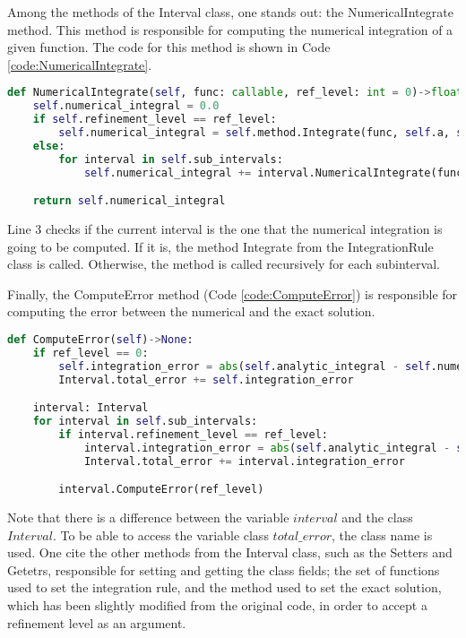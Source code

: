 Among the methods of the Interval class, one stands out: the NumericalIntegrate method. This method is responsible for computing the numerical integration of a given function. The code for this method is shown in Code \ref{code:NumericalIntegrate}. 
\begin{lstlisting}[language=python, caption={NumericalIntegrate Method.}, label={code:NumericalIntegrate}]
def NumericalIntegrate(self, func: callable, ref_level: int = 0)->float:
    self.numerical_integral = 0.0
    if self.refinement_level == ref_level:
        self.numerical_integral = self.method.Integrate(func, self.a, self.b, self.n_points)
    else:
        for interval in self.sub_intervals:
            self.numerical_integral += interval.NumericalIntegrate(func, ref_level)

    return self.numerical_integral
\end{lstlisting}

Line 3 checks if the current interval is the one that the numerical integration is going to be computed. If it is, the method Integrate from the IntegrationRule class is called. Otherwise, the method is called recursively for each subinterval.

Finally, the ComputeError method (Code \ref{code:ComputeError}) is responsible for computing the error between the numerical and the exact solution.
\begin{lstlisting}[language=python, caption={ComputeError Method}, label={code:ComputeError}]
def ComputeError(self)->None:
    if ref_level == 0:
        self.integration_error = abs(self.analytic_integral - self.numerical_integral)
        Interval.total_error += self.integration_error

    interval: Interval
    for interval in self.sub_intervals:
        if interval.refinement_level == ref_level: 
            interval.integration_error = abs(self.analytic_integral - self.numerical_integral)
            Interval.total_error += interval.integration_error

        interval.ComputeError(ref_level)
\end{lstlisting}

Note that there is a difference between the variable $interval$ and the class $Interval$. To be able to access the variable class $total\_error$, the class name is used. One cite the other methods from the Interval class, such as the Setters and Getetrs, responsible for setting and getting the class fields; the set of functions used to set the integration rule, and the method used to set the exact solution, which has been slightly modified from the original code, in order to accept a refinement level as an argument.

